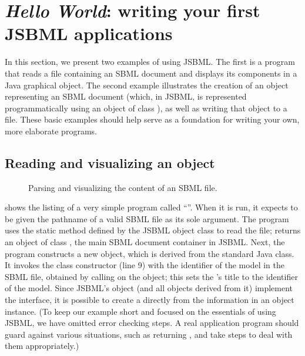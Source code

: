 
\section[Writing your first JSBML application]{\emph{Hello World}: writing your first JSBML applications}
\label{sec:hello-world}

In this section, we present two examples of using JSBML. The first is a
program that reads a file containing an SBML document and displays its
components in a Java \JTree graphical object. The second example
illustrates the creation of an object representing an SBML document (which,
in JSBML, is represented programmatically using an object of class
\SBMLDocument), as well as writing that object to a file. These basic
examples should help serve as a foundation for writing your own, more
elaborate programs.


\subsection{Reading and visualizing an  object}

\begin{figure}[b]
  \caption{Parsing and visualizing the content of an SBML file.}
  \label{fig:JSBMLvisualizer-source}
\end{figure}

 shows the listing of a very simple
program called ``''. When it is run, it expects to
be given the pathname of a valid SBML file as  its
sole argument. The program uses the static method  defined
by the JSBML object class \SBMLReader to read the file; \SBMLReader
returns an object of class \SBMLDocument, the main SBML document
container in JSBML.  Next, the program constructs a new
 object, which is derived from the standard Java
\JFrame class. It invokes the class constructor (line 9) with the
identifier of the model in the SBML file, obtained by calling
 on the \SBMLDocument object; this sets the
\JFrame's title to the identifier of the model. Since JSBML's \SBase
object (and all objects derived from it) implement the \TreeNode
interface, it is possible to create a \JTree directly from the
information in an \SBMLDocument object instance.  (To keep our example
short and focused on the essentials of using JSBML, we have omitted
error checking steps.  A real application program should guard against
various situations, such as  returning , and
take steps to deal with them appropriately.)

